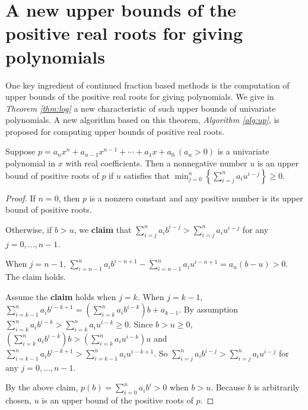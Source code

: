 
\section{A new upper bounds of the positive real roots for giving  polynomials}
\label{sec:thm}

One key ingredient of continued fraction based methods is the computation of upper bounds of the positive real roots for giving  polynomials. We give in {\em Theorem \ref{thm:log}} a new characteristic of such upper bounds of univariate polynomials. A new algorithm based on this theorem, {\em Algorithm \ref{alg:up}}, is proposed for computing upper bounds of positive real roots.


\begin{theorem} \label{thm:log}
  Suppose   $p=a_nx^n+a_{n-1}x^{n-1}+\cdots+a_1x+a_0\ (a_n>0)$  is a univariate polynomial in $x$ with real coefficients.  Then  a nonnegative number $u$ is an upper bound of positive roots of $p$ if $u$   satisfies that $\min_{j=0}^{n}\left\{  \sum_{i=j}^n a_i u^{i-j}\right\}\ge0$.
\end{theorem}
\begin{proof}
  If $n=0$, then $p$ is a nonzero constant and any positive number is its upper bound of positive roots.

  Otherwise, if $b>u$,  we {\bf claim} that $\sum_{i=j}^na_ib^{i-j}> \sum_{i=j}^na_iu^{i-j}$ for any $j= 0,\ldots,n-1$.

  When $j=n-1$, $\sum_{i=n-1}^na_ib^{i-n+1}-\sum_{i=n-1}^na_iu^{i-n+1}=a_n(b-u)>0.$ The claim holds.

  Assume the {\bf claim} holds  when $j=k$. When $j=k-1$,  $\sum_{i=k-1}^na_ib^{i-k+1}=\left(\sum_{i=k}^na_ib^{i-k}\right)b+a_{k-1} $. By assumption
  $\sum_{i=k}^na_ib^{i-k}>\sum_{i=k}^na_iu^{i-k}\ge0$. Since $b>u\ge0$, $\left(\sum_{i=k}^na_ib^{i-k}\right)b>\left (\sum_{i=k}^na_iu^{i-k} \right)u  $
  and $\sum_{i=k-1}^na_ib^{i-k+1}> \sum_{i=k-1}^na_iu^{i-k+1}$. So  $\sum_{i=j}^na_ib^{i-j}> \sum_{i=j}^na_iu^{i-j}$ for any $j= 0,\ldots,n-1$.


  By the above claim,   $p(b)=\sum_{i=0}^na_ib^i>0$ when  $b>u$. Because $b$ is arbitrarily chosen, $u$ is an upper bound of the positive roots of $p$.

\end{proof}



